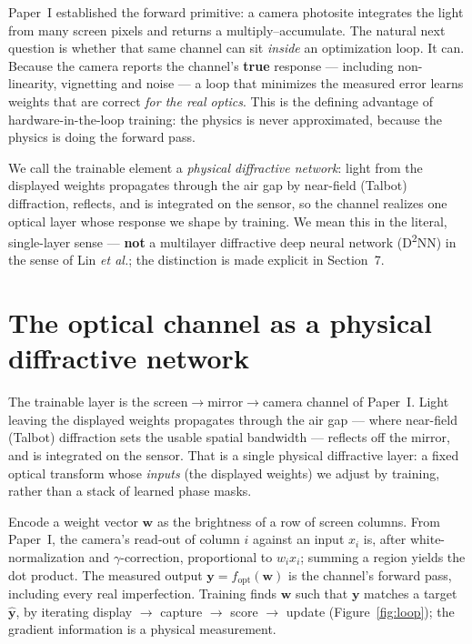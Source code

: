 \documentclass[11pt]{article}
\begin{document}
Paper~I established the forward primitive: a camera photosite integrates the light from many
screen pixels and returns a multiply--accumulate. The natural next question is whether that same
channel can sit \emph{inside} an optimization loop. It can. Because the camera reports the
channel's \textbf{true} response --- including non-linearity, vignetting and noise --- a loop
that minimizes the measured error learns weights that are correct \emph{for the real optics}.
This is the defining advantage of hardware-in-the-loop training: the physics is never
approximated, because the physics is doing the forward pass.

We call the trainable element a \emph{physical diffractive network}: light from the displayed
weights propagates through the air gap by near-field (Talbot) diffraction, reflects, and is
integrated on the sensor, so the channel realizes one optical layer whose response we shape by
training. We mean this in the literal, single-layer sense --- \textbf{not} a multilayer
diffractive deep neural network (D\textsuperscript{2}NN) in the sense of Lin \emph{et al.}; the
distinction is made explicit in Section~7.

\section{The optical channel as a physical diffractive network}
The trainable layer is the screen$\to$mirror$\to$camera channel of Paper~I. Light leaving the
displayed weights propagates through the air gap --- where near-field (Talbot) diffraction sets
the usable spatial bandwidth --- reflects off the mirror, and is integrated on the sensor. That
is a single physical diffractive layer: a fixed optical transform whose \emph{inputs} (the
displayed weights) we adjust by training, rather than a stack of learned phase masks.

Encode a weight vector $\mathbf{w}$ as the brightness of a row of screen columns. From Paper~I,
the camera's read-out of column $i$ against an input $x_i$ is, after white-normalization and
$\gamma$-correction, proportional to $w_i x_i$; summing a region yields the dot product. The
measured output $\mathbf{y}=f_\text{opt}(\mathbf{w})$ is the channel's forward pass, including
every real imperfection. Training finds $\mathbf{w}$ such that $\mathbf{y}$ matches a target
$\hat{\mathbf{y}}$, by iterating display $\to$ capture $\to$ score $\to$ update
(Figure~\ref{fig:loop}); the gradient information is a physical measurement.
\end{document}
